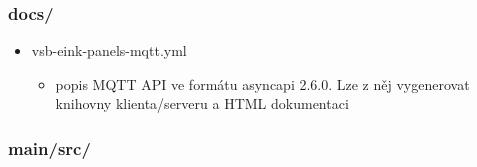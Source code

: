 \subsubsection*{docs/}
\begin{itemize}
    \item vsb-eink-panels-mqtt.yml
    \begin{itemize}
        \item popis MQTT API ve formátu asyncapi 2.6.0. Lze z něj vygenerovat knihovny klienta/serveru a HTML dokumentaci
    \end{itemize}
\end{itemize}

\subsubsection*{main/src/}
